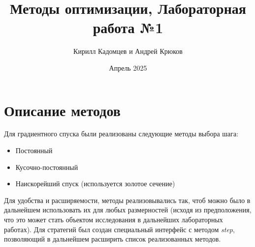 \documentclass{article}
\title{Методы оптимизации, Лабораторная работа №1}
\author{Кирилл Кадомцев и Андрей Крюков}
\date{Апрель 2025}
\begin{document}
\maketitle
\tableofcontents

\section{Описание методов}
Для градиентного спуска были реализованы следующие методы выбора шага:
\begin{itemize}
    \item 
    Постоянный
    \item
    Кусочно-постоянный
    \item
    Наискорейший спуск (используется золотое сечение)
\end{itemize}
Для удобства и расширяемости, методы реализовывались так, чтоб можно было в дальнейшем использовать их для любых размерностей (исходя из предположения, что это может стать объектом исследования в дальнейших лабораторных работах). Для стратегий был создан специальный интерфейс с методом \textit{step}, позволяющий в дальнейшем расширить список реализованных методов.
\end{document}
